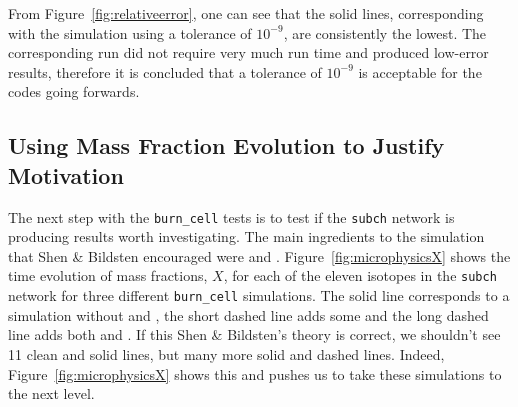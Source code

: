 \documentclass[preprint]{aastex62}
\begin{document}
      From Figure~\ref{fig:relativeerror}, one can see that the solid lines, corresponding with the simulation using a tolerance of $10^{-9}$, are consistently the lowest. The corresponding run did not require very much run time and produced low-error results, therefore it is concluded that a tolerance of $10^{-9}$ is acceptable for the codes going forwards. 
  
    \subsection{Using Mass Fraction Evolution to Justify Motivation}
    
      The next step with the {\tt burn\_cell} tests is to test if the {\tt subch} network is producing results worth investigating. The main ingredients to the simulation that Shen \& Bildsten encouraged were  and . %
      Figure~\ref{fig:microphysicsX} shows the time evolution of mass fractions, $X$, for each of the eleven isotopes in the {\tt subch} network for three different {\tt burn\_cell} simulations. The solid line corresponds to a simulation without  and , the short dashed line adds some  and the long dashed line adds both  and . If this Shen \& Bildsten's theory is correct, we shouldn't see 11 clean and solid lines, but many more solid and dashed lines. Indeed, Figure~\ref{fig:microphysicsX} shows this and pushes us to take these simulations to the next level.
      
      
\end{document}
